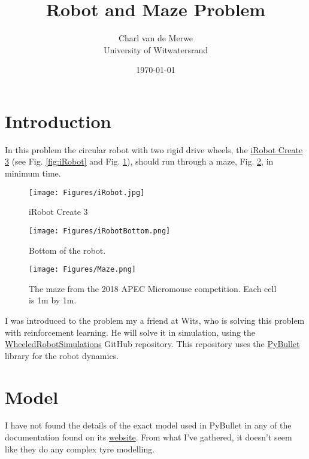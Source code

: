 \documentclass[12pt]{article}
\numberwithin{equation}{section} %
\numberwithin{figure}{section} %
\begin{document}
	
\title{Robot and Maze Problem}
\author{Charl van de Merwe \\ University of Witwatersrand}
\date{\today}

\maketitle

\section{Introduction}

In this problem the circular robot with two rigid drive wheels, the {\color{blue} \href{https://edu.irobot.com/what-we-offer/create3}{iRobot Create 3}} (see Fig. \ref{fig:iRobot} and Fig. \ref{fig:iRobotBottom}), should run through a maze, Fig. \ref{fig:Maze}, in minimum time.

\begin{figure}[h!]
	\centering
	\begin{minipage}[b]{0.45\textwidth}
		\centering
		\texttt{[image: Figures/iRobot.jpg]}
		\caption{iRobot Create 3}
		\label{fig:iRobot}
	\end{minipage}
	\hfill
	\begin{minipage}[b]{0.45\textwidth}
		\centering
		\texttt{[image: Figures/iRobotBottom.png]}
		\caption{Bottom of the robot.}
		\label{fig:iRobotBottom}
	\end{minipage}
\end{figure}

\begin{figure}[h!]
	\centering
	\texttt{[image: Figures/Maze.png]}
	\caption{The maze from the 2018 APEC Micromouse competition. Each cell is 1m by 1m.}
	\label{fig:Maze}
\end{figure}

I was introduced to the problem my a friend at Wits, who is solving this problem with reinforcement learning. He will solve it in simulation, using the {\color{blue} \href{https://github.com/Yurof/WheeledRobotSimulations}{WheeledRobotSimulations}} GitHub repository. This repository uses the {\color{blue} \href{https://github.com/bulletphysics/bullet3}{PyBullet}} library for the robot dynamics.

\section{Model}

I have not found the details of the exact model used in PyBullet in any of the documentation found on its {\color{blue} \href{https://pybullet.org/wordpress/}{website}}. From what I've gathered, it doesn't seem like they do any complex tyre modelling.
\end{document}
